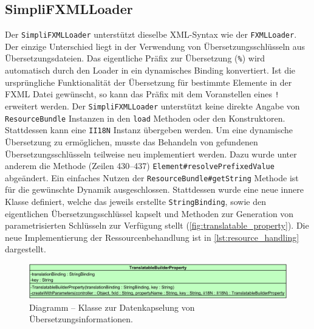 \subsection{SimpliFXMLLoader}
Der \texttt{SimpliFXMLLoader} unterstützt dieselbe XML-Syntax wie der \texttt{FXMLLoader}. Der einzige Unterschied liegt in der Verwendung von Übersetzungsschlüsseln aus Übersetzungsdateien. Das eigentliche Präfix zur Übersetzung (\glqq\texttt{\%}\grqq) wird automatisch durch den Loader in ein dynamisches Binding konvertiert. Ist die ursprüngliche Funktionalität der Übersetzung für bestimmte Elemente in der FXML Datei gewünscht, so kann das Präfix mit dem Voranstellen eines \glqq\texttt{!}\grqq{} erweitert werden. Der \texttt{SimpliFXMLLoader} unterstützt keine direkte Angabe von \texttt{ResourceBundle} Instanzen in den \texttt{load} Methoden oder den Konstruktoren. Stattdessen kann eine \texttt{II18N} Instanz übergeben werden. Um eine dynamische Übersetzung zu ermöglichen, musste das Behandeln von gefundenen Übersetzungsschlüsseln teilweise neu implementiert werden. Dazu wurde unter anderem die Methode (Zeilen 430--437) \texttt{Element\#resolvePrefixedValue} abgeändert. Ein einfaches Nutzen der \texttt{ResourceBundle\#getString} Methode ist für die gewünschte Dynamik ausgeschlossen. Stattdessen wurde eine neue innere Klasse definiert, welche das jeweils erstellte \texttt{StringBinding}, sowie den eigentlichen Übersetzungsschlüssel kapselt und Methoden zur Generation von parametrisierten Schlüsseln zur Verfügung stellt (\autoref{fig:translatable_property}). Die neue Implementierung der Ressourcenbehandlung ist in \autoref{lst:resource_handling} dargestellt.
\begin{figure}[H]
	\centering
	\includegraphics[width=\textwidth]{Abbildungen/Ressourcenbehandlung.png}
	\caption{Diagramm -- Klasse zur Datenkapselung von Übersetzungsinformationen.}
	\label{fig:translatable_property}
\end{figure}
